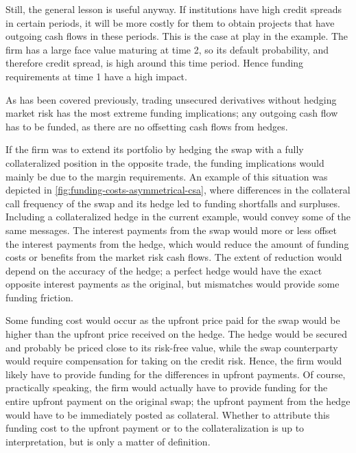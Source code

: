 \documentclass[main.tex]{subfiles}
\begin{document}
        Still, the general lesson is useful anyway.
        If institutions have high credit spreads in certain periods,
        it will be more costly for them to obtain projects 
        that have outgoing cash flows in these periods.
        This is the case at play in the example.
        The firm has a large face value maturing at time 2, 
        so its default probability, and therefore credit spread,
        is high around this time period.
        Hence funding requirements at time 1 have a high impact.

        As has been covered previously, trading unsecured derivatives without hedging market risk
        has the most extreme funding implications;
        any outgoing cash flow has to be funded, 
        as there are no offsetting cash flows from hedges.

        If the firm was to extend its portfolio by hedging the swap
        with a fully collateralized position in the opposite trade,
        the funding implications would mainly be due to the margin requirements.
        An example of this situation was depicted in \cref{fig:funding-costs-asymmetrical-csa},
        where differences in the collateral call frequency of the swap and its hedge
        led to funding shortfalls and surpluses.
        Including a collateralized hedge in the current example, would convey some of the same messages.
        The interest payments from the swap would more or less 
        offset the interest payments from the hedge, 
        which would reduce the amount of funding costs or benefits from the market risk cash flows.
        The extent of reduction would depend on the accuracy of the hedge;
        a perfect hedge would have the exact opposite interest payments as the original,
        but mismatches would provide some funding friction.
        
        Some funding cost would occur as the upfront price paid for the swap 
        would be higher than the upfront price received on the hedge.
        The hedge would be secured and probably be priced close to its risk-free value, 
        while the swap counterparty would require compensation for taking on the credit risk.
        Hence, the firm would likely have to provide funding 
        for the differences in upfront payments.
        Of course, practically speaking, the firm would actually have to provide funding
        for the entire upfront payment on the original swap;
        the upfront payment from the hedge would have to be immediately posted as collateral.
        Whether to attribute this funding cost to the upfront payment or to the collateralization
        is up to interpretation, but is only a matter of definition.
\end{document}
